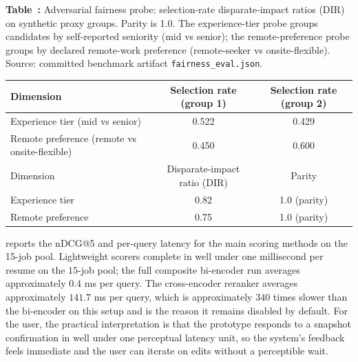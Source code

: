 \begin{center}
\label{tab:fairness}
\par\smallskip\noindent\textbf{Table~\thetable:} Adversarial fairness probe: selection-rate disparate-impact ratios (DIR) on synthetic proxy groups. Parity is 1.0. The experience-tier probe groups candidates by self-reported seniority (mid vs senior); the remote-preference probe groups by declared remote-work preference (remote-seeker vs onsite-flexible). Source: committed benchmark artifact \texttt{fairness\_eval.json}.
\par\smallskip
\scriptsize
\setlength{\tabcolsep}{3pt}
\begin{tabular*}{\linewidth}{@{\extracolsep{\fill}}lcc@{}}
\toprule
Dimension & Selection rate (group 1) & Selection rate (group 2) \\
\midrule
Experience tier (mid vs senior)  & 0.522 & 0.429 \\
Remote preference (remote vs onsite-flexible) & 0.450 & 0.600 \\
\midrule
Dimension & Disparate-impact ratio (DIR) & Parity \\
\midrule
Experience tier  & 0.82 & 1.0 (parity) \\
Remote preference & 0.75 & 1.0 (parity) \\
\bottomrule
\end{tabular*}
\par\vspace{0.4em}
\normalsize
\end{center}

 reports the nDCG@5 and per-query latency for the main scoring methods on the 15-job pool.
Lightweight scorers complete in well under one millisecond per resume on the $15$-job pool; the full composite bi-encoder run averages approximately $0.4$ ms per query.
The cross-encoder reranker averages approximately $141.7$ ms per query, which is approximately $340$ times slower than the bi-encoder on this setup and is the reason it remains disabled by default.
For the user, the practical interpretation is that the prototype responds to a snapshot confirmation in well under one perceptual latency unit, so the system's feedback feels immediate and the user can iterate on edits without a perceptible wait.

